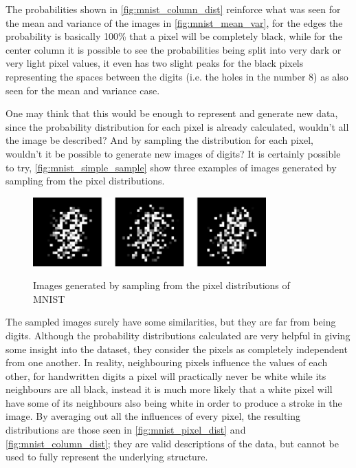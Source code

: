 The probabilities shown in \autoref{fig:mnist_column_dist} reinforce what was seen for the mean and variance of the images in \autoref{fig:mnist_mean_var}, for the edges the probability is basically 100\% that a pixel will be completely black, while for the center column it is possible to see the probabilities being split into very dark or very light pixel values, it even has two slight peaks for the black pixels representing the spaces between the digits (i.e. the holes in the number $8$) as also seen for the mean and variance case.

One may think that this would be enough to represent and generate new data, since the probability distribution for each pixel is already calculated, wouldn't all the image be described? And by sampling the distribution for each pixel, wouldn't it be possible to generate new images of digits? It is certainly possible to try, \autoref{fig:mnist_simple_sample} show three examples of images generated by sampling from the pixel distributions.
\begin{figure} [hbt]
    \centering
    \caption{Images generated by sampling from the pixel distributions of \gls{MNIST}}
    \includegraphics[width=0.8\textwidth]{chapters/GANs/figures/mnist_simple_samples.pdf}
    \label{fig:mnist_simple_sample}
\end{figure}

The sampled images surely have some similarities, but they are far from being digits. Although the probability distributions calculated are very helpful in giving some insight into the dataset, they consider the pixels as completely independent from one another. In reality, neighbouring pixels influence the values of each other, for handwritten digits a pixel will practically never be white while its neighbours are all black, instead it is much more likely that a white pixel will have some of its neighbours also being white in order to produce a stroke in the image. By averaging out all the influences of every pixel, the resulting distributions are those seen in \autoref{fig:mnist_pixel_dist} and \autoref{fig:mnist_column_dist}; they are valid descriptions of the data, but cannot be used to fully represent the underlying structure.

